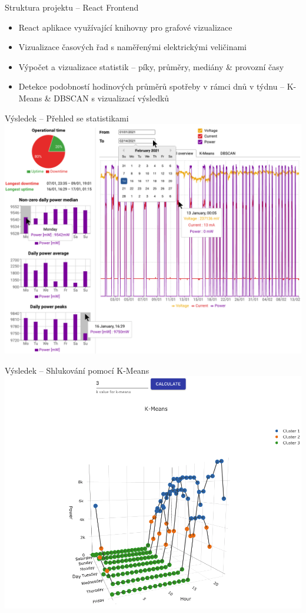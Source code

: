 \documentclass{beamer}
\begin{document}
\begin{frame}{Struktura projektu – React Frontend}
	\begin{itemize}
		\item React aplikace využívající knihovny pro grafové vizualizace
		\item Vizualizace časových řad s naměřenými elektrickými veličinami
		\item Výpočet a vizualizace statistik – píky, průměry, mediány \& provozní časy
		\item Detekce podobností hodinových průměrů spotřeby v rámci dnů v týdnu – K-Means \& DBSCAN s vizualizací výsledků
	\end{itemize}
\end{frame}


\begin{frame}{Výsledek – Přehled se statistikami}
	\centering
	\includegraphics[scale=0.225]{React1}
\end{frame}

\begin{frame}{Výsledek – Shlukování pomocí K-Means}
	\centering
	\includegraphics[scale=0.275]{React2}
\end{frame}
\end{document}
